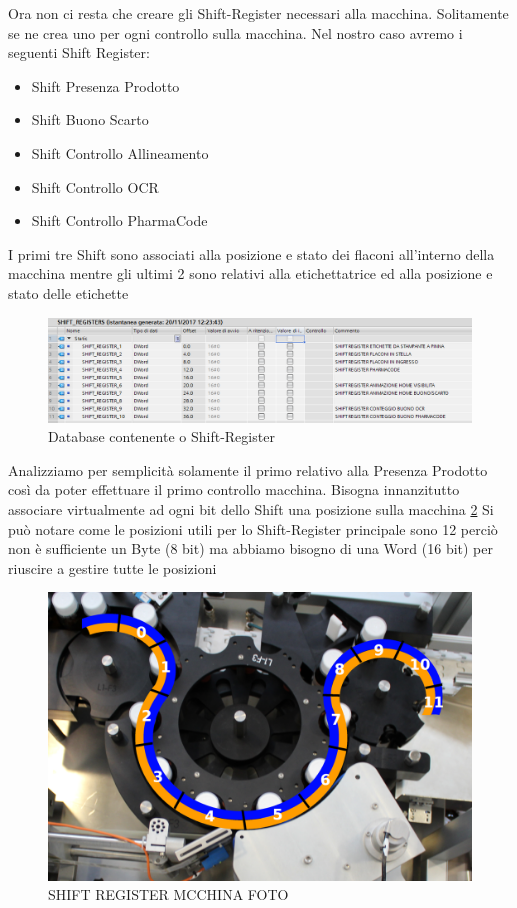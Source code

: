 \documentclass[12pt, a4paper, oneside]{book}
\begin{document}
Ora non ci resta che creare gli Shift-Register necessari alla macchina. Solitamente se ne crea uno per ogni controllo sulla macchina. Nel nostro caso avremo i seguenti Shift Register:
\begin{itemize}
	\item Shift Presenza Prodotto
	\item Shift Buono Scarto
	\item Shift Controllo Allineamento
	\item Shift Controllo OCR
	\item Shift Controllo PharmaCode
\end{itemize}

I primi tre Shift sono associati alla posizione e stato dei flaconi all'interno della macchina mentre gli ultimi 2 sono relativi alla etichettatrice ed alla posizione e stato delle etichette

\begin{figure}[H]
	\centering
	\includegraphics[width=12cm]{Immagini/SH8}
	\caption{ Database contenente o Shift-Register}
	\label{sh8}
\end{figure}


Analizziamo per semplicità solamente il primo relativo alla Presenza Prodotto così da poter effettuare il primo controllo macchina. Bisogna innanzitutto associare virtualmente ad ogni bit dello Shift una posizione sulla macchina \ref{sh2} Si può notare come le posizioni utili per lo Shift-Register principale sono 12 perciò non è sufficiente un Byte (8 bit) ma abbiamo bisogno di una Word (16 bit) per riuscire a gestire tutte le posizioni

\begin{figure}[H]
	\centering
	\includegraphics[width=12cm]{Immagini/SH2}
	\caption{ SHIFT REGISTER MCCHINA FOTO}
	\label{sh2}
\end{figure}
\end{document}
